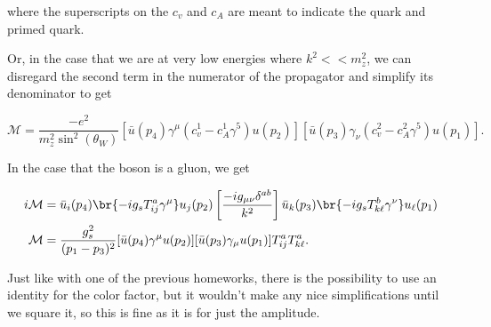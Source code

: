 where the superscripts on the $c_v$ and $c_A$ are meant to indicate the quark and primed quark.

Or, in the case that we are at very low energies where $k^2 << m_z^2$, we can disregard the second term in the numerator of the propagator and simplify its denominator to get

\begin{equation}
  \mathcal{M} = \frac{-e^2}{m_z^2\sin^2(\theta_W)} [\bar{u}(p_4) \gamma^\mu(c_v^1 - c_A^1 \gamma^5)u(p_2)][\bar{u}(p_3) \gamma_\nu (c^2_v - c_A^2\gamma^5)u(p_1)].
\end{equation}

In the case that the boson is a gluon, we get

\begin{align}
  i\mathcal{M} &= \bar{u}_i(p_4) \br{-ig_sT^a_{ij}\gamma^\mu} u_j(p_2) \left[ \frac{-ig_{\mu\nu}\delta^{ab}}{k^2} \right] \bar{u}_k(p_3) \br{-ig_sT^b_{k\ell}\gamma^\nu}u_\ell(p_1) \\
  \mathcal{M} &= \frac{g_s^2}{(p_1 - p_3)^2} [\bar{u}(p_4) \gamma^\mu u(p_2)][\bar{u}(p_3) \gamma_\mu u(p_1)] T^a_{ij}T^a_{k\ell}.
\end{align}

Just like with one of the previous homeworks, there is the possibility to use an identity for the color factor, but it wouldn't make any nice simplifications until we square it, so this is fine as it is for just the amplitude.



